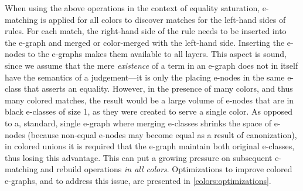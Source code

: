 When using the above operations in the context of equality saturation, e-matching is applied for all colors
to discover matches for the left-hand sides of rules.
For each match, the right-hand side of the rule needs to be inserted into the e-graph and merged or color-merged with the left-hand side.
Inserting the e-nodes to the e-graphs makes them available to all layers.
This aspect is sound, since
we assume that the mere \emph{existence} of a term in an e-graph does not in itself have the semantics of a judgement---it is only the placing e-nodes in the same e-class that asserts an equality.
However, in the presence of many colors, and thus many colored matches, the result would be a large volume of e-nodes that are in black e-classes of size 1, as they
were created to serve a single color.
As opposed to a, standard, single e-graph where merging e-classes shrinks the space of e-nodes (because non-equal e-nodes may become equal as a result of canonization),
in colored unions it is required that the e-graph maintain both original e-classes, thus losing this advantage.
This can put a growing pressure on subsequent e-matching and rebuild operations \emph{in all colors}.
Optimizations to improve colored e-graphs, and to address this issue, are presented in \autoref{colors:optimizations}.


